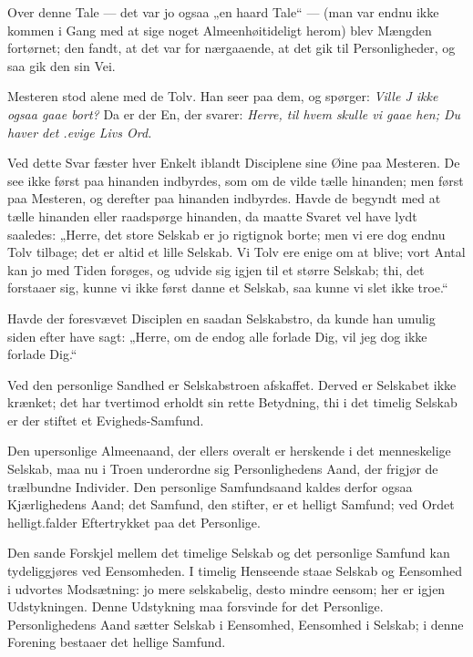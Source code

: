 \documentclass[12pt,a4paper]{book}
\newcommand{\apage}[1]{\marginnote{\footnotesize\textit{[#1]}}}
\begin{document}
Over denne Tale --- det var jo ogsaa „en haard Tale“ --- (man var endnu ikke kommen i Gang med at sige noget Almeenhøitideligt herom) blev Mængden fortørnet; den fandt, at det var for nærgaaende, at det gik til Personligheder, og saa gik den sin Vei.

Mesteren stod alene med de Tolv. Han seer paa dem, og spørger: \emph{Ville J ikke ogsaa gaae bort?} Da er der En, der svarer: \emph{Herre, til hvem skulle vi gaae hen; Du haver det .evige Livs Ord.}

Ved dette Svar fæster hver Enkelt iblandt Disciplene sine Øine paa Mesteren. De see ikke først paa hinanden indbyrdes, som om de vilde tælle hinanden; men først paa Mesteren, og derefter paa hinanden indbyrdes. Havde de begyndt med at tælle hinanden eller raadspørge hinanden, da maatte Svaret vel have lydt saaledes: „Herre, det store Selskab er jo rigtignok borte; men vi ere dog endnu Tolv tilbage; det er altid et lille Selskab. Vi Tolv ere enige om at blive; vort Antal kan jo med Tiden forøges, og udvide sig igjen til et større Selskab; thi, det forstaaer sig, kunne vi ikke først danne et Selskab, saa kunne vi slet ikke troe.“
 \apage{50}

Havde der foresvævet Disciplen en saadan Selskabstro, da kunde han umulig siden efter have sagt: „Herre, om de endog alle forlade Dig, vil jeg dog ikke forlade Dig.“

Ved den personlige Sandhed er Selskabstroen afskaffet. Derved er Selskabet ikke krænket; det har tvertimod erholdt sin rette Betydning, thi i det timelig Selskab er der stiftet et Evigheds-Samfund.

Den upersonlige Almeenaand, der ellers overalt er herskende i det menneskelige Selskab, maa nu i Troen underordne sig Personlighedens Aand, der frigjør de trælbundne Individer. Den personlige Samfundsaand kaldes derfor ogsaa Kjærlighedens Aand; det Samfund, den stifter, er et helligt Samfund; ved Ordet helligt.falder Eftertrykket paa det Personlige.

Den sande Forskjel mellem det timelige Selskab og det personlige Samfund kan tydeliggjøres ved Eensomheden. I timelig Henseende staae Selskab og Eensomhed i udvortes Modsætning: jo mere selskabelig, desto mindre eensom; her er igjen Udstykningen. Denne Udstykning maa forsvinde for det Personlige. Personlighedens Aand sætter Selskab i Eensomhed, Eensomhed i Selskab; i denne Forening bestaaer det hellige Samfund.
\end{document}
